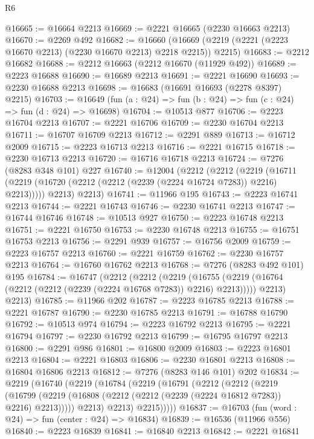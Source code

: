 \begin{lexlean}{R6}
\begin{coremodule}
@16665 := @16664 @2213
@16669 := @2221 @16665 (@2230 @16663 @2213)
@16670 := @2269 @492
@16682 := @16660
    (@16669 (@2219 (@2221 (@2223 @16670 @2213) (@2230 @16670 @2213) @2218 @2215)) @2215)
@16683 := @2212 @16682
@16688 := @2212 @16663 (@2212 @16670 (@11929 @492))
@16689 := @2223 @16688
@16690 := @16689 @2213
@16691 := @2221 @16690
@16693 := @2230 @16688 @2213
@16698 := @16683 (@16691 @16693 (@2278 @8397) @2215)
@16703 := @16649 (fun (a : @24) => fun (b : @24) => fun (c : @24) => fun (d : @24) => @16698)
@16704 := @10513 @877
@16706 := @2223 @16704 @2213
@16707 := @2221 @16706
@16709 := @2230 @16704 @2213
@16711 := @16707 @16709 @2213
@16712 := @2291 @889
@16713 := @16712 @2009
@16715 := @2223 @16713 @2213
@16716 := @2221 @16715
@16718 := @2230 @16713 @2213
@16720 := @16716 @16718 @2213
@16724 := @7276 (@8283 @348 @101) @227
@16740 := @12004
    (@2212
      (@2212
        (@2219 (@16711 (@2219 (@16720 (@2212 (@2212 (@2239 (@2224 @16724 @7283)) @2216) @2213)))))
        @2213)
      @2213)
@16741 := @11966 @195
@16743 := @2223 @16741 @2213
@16744 := @2221 @16743
@16746 := @2230 @16741 @2213
@16747 := @16744 @16746
@16748 := @10513 @927
@16750 := @2223 @16748 @2213
@16751 := @2221 @16750
@16753 := @2230 @16748 @2213
@16755 := @16751 @16753 @2213
@16756 := @2291 @939
@16757 := @16756 @2009
@16759 := @2223 @16757 @2213
@16760 := @2221 @16759
@16762 := @2230 @16757 @2213
@16764 := @16760 @16762 @2213
@16768 := @7276 (@8283 @492 @101) @195
@16784 := @16747
    (@2212
      (@2212
        (@2219 (@16755 (@2219 (@16764 (@2212 (@2212 (@2239 (@2224 @16768 @7283)) @2216) @2213)))))
        @2213)
      @2213)
@16785 := @11966 @202
@16787 := @2223 @16785 @2213
@16788 := @2221 @16787
@16790 := @2230 @16785 @2213
@16791 := @16788 @16790
@16792 := @10513 @974
@16794 := @2223 @16792 @2213
@16795 := @2221 @16794
@16797 := @2230 @16792 @2213
@16799 := @16795 @16797 @2213
@16800 := @2291 @986
@16801 := @16800 @2009
@16803 := @2223 @16801 @2213
@16804 := @2221 @16803
@16806 := @2230 @16801 @2213
@16808 := @16804 @16806 @2213
@16812 := @7276 (@8283 @146 @101) @202
@16834 := @2219
    (@16740
      (@2219
        (@16784
          (@2219
            (@16791
              (@2212
                (@2212
                  (@2219
                    (@16799
                      (@2219 (@16808 (@2212 (@2212 (@2239 (@2224 @16812 @7283)) @2216) @2213)))))
                  @2213)
                @2213)
              @2215)))))
@16837 := @16703 (fun (word : @24) => fun (center : @24) => @16834)
@16839 := @16536 (@11966 @556)
@16840 := @2223 @16839
@16841 := @16840 @2213
@16842 := @2221 @16841

\end{coremodule}
\end{lexlean}
